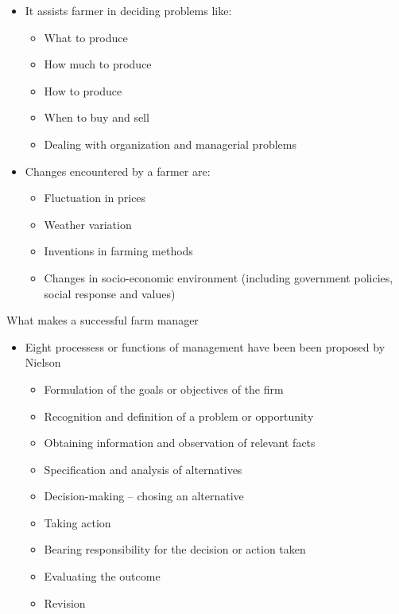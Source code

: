 \documentclass[12pt,ignorenonframetext,aspectratio=169]{beamer}
\providecommand{\tightlist}{%
  \setlength{\itemsep}{0pt}\setlength{\parskip}{0pt}}
\begin{document}
\begin{frame}{}
\protect\hypertarget{section-1}{}

\begin{itemize}
\tightlist
\item
  It assists farmer in deciding problems like:

  \begin{itemize}
  \tightlist
  \item
    What to produce
  \item
    How much to produce
  \item
    How to produce
  \item
    When to buy and sell
  \item
    Dealing with organization and managerial problems
  \end{itemize}
\item
  Changes encountered by a farmer are:

  \begin{itemize}
  \tightlist
  \item
    Fluctuation in prices
  \item
    Weather variation
  \item
    Inventions in farming methods
  \item
    Changes in socio-economic environment (including government
    policies, social response and values)
  \end{itemize}
\end{itemize}

\end{frame}

\begin{frame}{What makes a successful farm manager}
\protect\hypertarget{what-makes-a-successful-farm-manager}{}

\begin{itemize}
\tightlist
\item
  Eight processess or functions of management have been been proposed by
  Nielson

  \begin{itemize}
  \tightlist
  \item
    Formulation of the goals or objectives of the firm
  \item
    Recognition and definition of a problem or opportunity
  \item
    Obtaining information and observation of relevant facts
  \item
    Specification and analysis of alternatives
  \item
    Decision-making -- chosing an alternative
  \item
    Taking action
  \item
    Bearing responsibility for the decision or action taken
  \item
    Evaluating the outcome
  \item
    Revision
  \end{itemize}
\end{itemize}

\end{frame}
\end{document}
